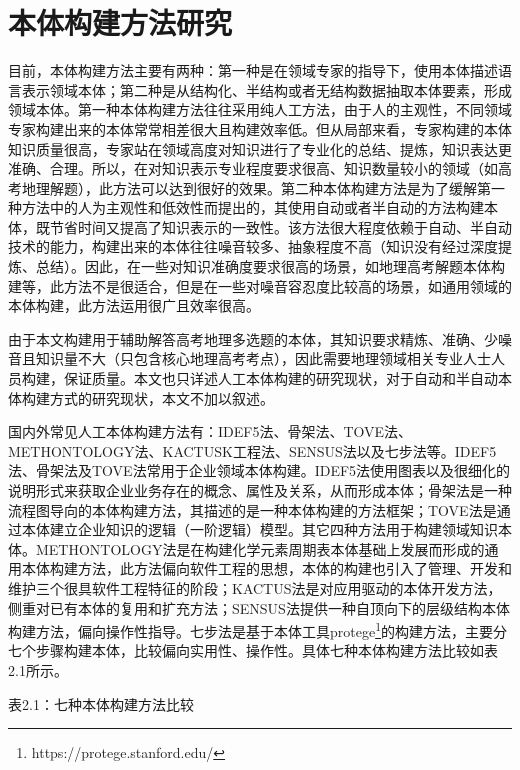 \section{本体构建方法研究}
目前，本体构建方法\cite{yue}主要有两种：第一种是在领域专家的指导下，使用本体描述语言表示领域本体；第二种是从结构化、半结构或者无结构数据抽取本体要素，形成领域本体。第一种本体构建方法往往采用纯人工方法，由于人的主观性，不同领域专家构建出来的本体常常相差很大且构建效率低。但从局部来看，专家构建的本体知识质量很高，专家站在领域高度对知识进行了专业化的总结、提炼，知识表达更准确、合理。所以，在对知识表示专业程度要求很高、知识数量较小的领域（如高考地理解题），此方法可以达到很好的效果。第二种本体构建方法是为了缓解第一种方法中的人为主观性和低效性而提出的，其使用自动或者半自动的方法构建本体，既节省时间又提高了知识表示的一致性。该方法很大程度依赖于自动、半自动技术的能力，构建出来的本体往往噪音较多、抽象程度不高（知识没有经过深度提炼、总结）。因此，在一些对知识准确度要求很高的场景，如地理高考解题本体构建等，此方法不是很适合，但是在一些对噪音容忍度比较高的场景，如通用领域的本体构建，此方法运用很广且效率很高。

由于本文构建用于辅助解答高考地理多选题的本体，其知识要求精炼、准确、少噪音且知识量不大（只包含核心地理高考考点），因此需要地理领域相关专业人士人员构建，保证质量。本文也只详述人工本体构建的研究现状，对于自动和半自动本体构建方式的研究现状，本文不加以叙述。

国内外常见人工本体构建方法有：IDEF5法\cite{IDEF5}、骨架法\cite{skelton}、TOVE法\cite{TOVE}、METHONTOLOGY法\cite{METHONTOLOGY}、KACTUSK工程法\cite{KACTUSK,KACTUSK2}、SENSUS法\cite{SENSUS}以及七步法\cite{seven}等。IDEF5法、骨架法及TOVE法常用于企业领域本体构建。IDEF5法使用图表以及很细化的说明形式来获取企业业务存在的概念、属性及关系，从而形成本体；骨架法是一种流程图导向的本体构建方法，其描述的是一种本体构建的方法框架；TOVE法是通过本体建立企业知识的逻辑（一阶逻辑）模型。其它四种方法用于构建领域知识本体。METHONTOLOGY法是在构建化学元素周期表本体基础上发展而形成的通用本体构建方法，此方法偏向软件工程的思想，本体的构建也引入了管理、开发和维护三个很具软件工程特征的阶段；KACTUS法是对应用驱动的本体开发方法，侧重对已有本体的复用和扩充方法；SENSUS法提供一种自顶向下的层级结构本体构建方法，偏向操作性指导。七步法是基于本体工具protege\footnote{https://protege.stanford.edu/}的构建方法，主要分七个步骤构建本体，比较偏向实用性、操作性。具体七种本体构建方法比较如表2.1所示。

\begin{center}
	\begin{small}
	表2.1：七种本体构建方法比较
	\end{small}
\end{center}

